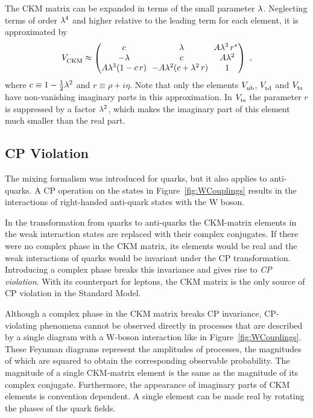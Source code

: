The CKM matrix can be expanded in terms of the small parameter $\lambda$. Neglecting terms of order $\lambda^4$ and higher relative to the
leading term for each element, it is approximated by \cite{Charles:2004jd}
\begin{equation}
  \label{eq:CKMApprox}
  \VCKM \approx
    \begin{pmatrix}
      c                  &  \lam                           &  \!\! A\lam^3\,r^* \\
      -\lam              &  c                              &  A\lam^2           \\
      A\lam^3(1 - c\,r)  &  \!\! -A\lam^2 (c + \lam^2\,r)  &  1
    \end{pmatrix}
    \ ,
\end{equation}
where $c\equiv1 - \tfrac{1}{2}\lambda^2$ and $r\equiv\rho+i\eta$. Note that only the elements $\Vub$, $\Vtd$ and $\Vts$ have non-vanishing
imaginary parts in this approximation. In $\Vts$ the parameter $r$ is suppressed by a factor $\lambda^2$, which makes the imaginary part of
this element much smaller than the real part.


\subsection{CP Violation}
\label{sec:intro_mixCPV_CPV}

The mixing formalism was introduced for quarks, but it also applies to anti-quarks. A CP operation on the states in
Figure~\ref{fig:WCouplings} results in the interactions of right-handed anti-quark states with the W boson.

In the transformation from quarks to anti-quarks the CKM-matrix elements in the weak interaction states are replaced with their complex
conjugates. If there were no complex phase in the CKM matrix, its elements would be real and the weak interactions of quarks would be
invariant under the CP transformation. Introducing a complex phase breaks this invariance and gives rise to \emph{CP violation}. With its
counterpart for leptons, the CKM matrix is the only source of CP violation in the Standard Model.

Although a complex phase in the CKM matrix breaks CP invariance, CP-violating phenomena cannot be observed directly in processes that are
described by a single diagram with a W-boson interaction like in Figure~\ref{fig:WCouplings}. These Feynman diagrams represent the
amplitudes of processes, the magnitudes of which are squared to obtain the corresponding observable probability. The magnitude of a single
CKM-matrix element is the same as the magnitude of its complex conjugate. Furthermore, the appearance of imaginary parts of CKM elements is
convention dependent. A single element can be made real by rotating the phases of the quark fields.

